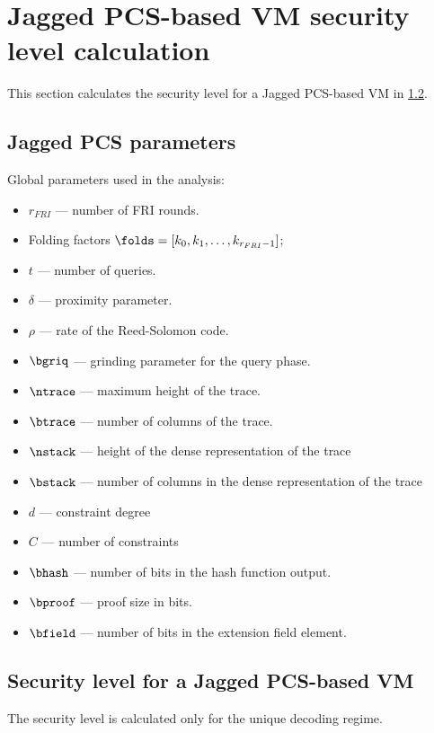 \newpage
\section{Jagged PCS-based VM security level calculation}

This section calculates the security level for a Jagged PCS-based VM in \cref{sec:jagged_security_level}.

\subsection{Jagged PCS parameters}

Global parameters used in the analysis:
\begin{itemize}
    \item $r_{FRI}$ --- number of FRI rounds.
    \item Folding factors $\folds=[k_0,k_1,\ldots,k_{r_{FRI}-1}]$;
    \item $t$ --- number of queries.
    \item $\delta$ --- proximity parameter.
    \item $\rho$ --- rate of the Reed-Solomon code.
    \item $\bgriq$ --- grinding parameter for the query phase.
    \item $\ntrace$ --- maximum height of the trace.
    \item $\btrace$ --- number of columns of the trace.
    \item $\nstack$ --- height of the dense representation of the trace
    \item $\bstack$ --- number of columns in the dense representation of the trace
    \item $d$ --- constraint degree
    \item $C$ --- number of constraints
    \item $\bhash$ --- number of bits in the hash function output.
    \item $\bproof$ --- proof size in bits.
    \item $\bfield$ --- number of bits in the extension field element.
\end{itemize}

\subsection{Security level for a Jagged PCS-based VM}\label{sec:jagged_security_level}
The security level is calculated only for the unique decoding regime. \\

